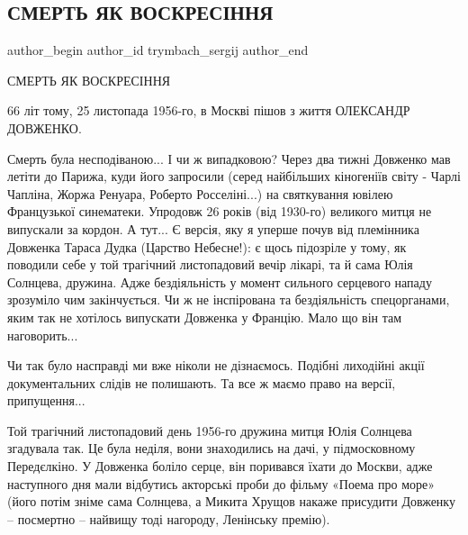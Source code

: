  
 
 
 
 
 
\subsection{СМЕРТЬ ЯК ВОСКРЕСІННЯ}
\label{sec:26_11_2022.fb.trymbach_sergij.1.smert_jak_voskresinnja}
 
\ifcmt
 author_begin
   author_id trymbach_sergij
 author_end
\fi

СМЕРТЬ ЯК ВОСКРЕСІННЯ

66 літ тому, 25 листопада 1956-го, в Москві пішов з життя ОЛЕКСАНДР ДОВЖЕНКО.

Смерть була несподіваною... І чи ж випадковою? Через два тижні Довженко мав
летіти до Парижа, куди його запросили (серед найбільших кіногеніїв світу -
Чарлі Чапліна, Жоржа Ренуара, Роберто Росселіні...) на святкування ювілею
Французької синематеки. Упродовж 26 років (від 1930-го) великого митця не
випускали за кордон. А тут... Є версія, яку я уперше почув від племінника
Довженка Тараса Дудка (Царство Небесне!): є щось підозріле у тому, як поводили
себе у той трагічний листопадовий вечір лікарі, та й сама Юлія Солнцева,
дружина. Адже бездіяльність у момент сильного серцевого нападу зрозуміло чим
закінчується. Чи ж не інспірована та бездіяльність спецорганами, яким так не
хотілось випускати Довженка у Францію. Мало що він там наговорить... 

Чи так було насправді ми вже ніколи не дізнаємось. Подібні лиходійні акції
документальних слідів не полишають. Та все ж маємо право на версії, припущення...  

Той трагічний листопадовий день 1956-го дружина митця Юлія Солнцева
згадувала так. Це була неділя, вони знаходились на дачі, у підмосковному
Передєлкіно. У Довженка боліло серце, він поривався їхати до Москви, адже
наступного дня мали відбутись акторські проби до фільму «Поема про море»
(його потім зніме сама Солнцева, а Микита Хрущов накаже присудити Довженку
– посмертно – найвищу тоді нагороду, Ленінську премію). 

